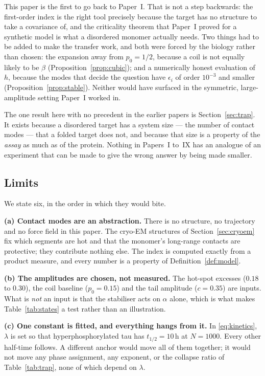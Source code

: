 \documentclass[11pt,reqno]{amsart}
\theoremstyle{plain}
\theoremstyle{definition}
\theoremstyle{remark}
\numberwithin{equation}{section}
\begin{document}
This paper is the first to go back to Paper~I. That is not a step backwards: the first-order index is the right tool precisely because the target has no structure to take a covariance of, and the criticality theorem that Paper~I proved for a synthetic model is what a disordered monomer actually needs. Two things had to be added to make the transfer work, and both were forced by the biology rather than chosen: the expansion away from $p_0=1/2$, because a coil is not equally likely to be $\beta$ (Proposition~\ref{prop:cubic}); and a numerically honest evaluation of $h$, because the modes that decide the question have $\epsilon_i$ of order $10^{-3}$ and smaller (Proposition~\ref{prop:stable}). Neither would have surfaced in the symmetric, large-amplitude setting Paper~I worked in.

The one result here with no precedent in the earlier papers is Section~\ref{sec:trap}. It exists because a disordered target has a system size --- the number of contact modes --- that a folded target does not, and because that size is a property of the \emph{assay} as much as of the protein. Nothing in Papers~I to~IX has an analogue of an experiment that can be made to give the wrong answer by being made smaller.

\subsection{Limits}
We state six, in the order in which they would bite.

\textbf{(a) Contact modes are an abstraction.} There is no structure, no trajectory and no force field in this paper. The cryo-EM structures of Section~\ref{sec:cryoem} fix which segments are hot and that the monomer's long-range contacts are protective; they contribute nothing else. The index is computed exactly from a product measure, and every number is a property of Definition~\ref{def:model}.

\textbf{(b) The amplitudes are chosen, not measured.} The hot-spot excesses ($0.18$ to $0.30$), the coil baseline ($p_0=0.15$) and the tail amplitude ($c=0.35$) are inputs. What is \emph{not} an input is that the stabiliser acts on $\alpha$ alone, which is what makes Table~\ref{tab:states} a test rather than an illustration.

\textbf{(c) One constant is fitted, and everything hangs from it.} In \eqref{eq:kinetics}, $\lambda$ is set so that hyperphosphorylated tau has $t_{1/2}=10$\,h at $N=1000$. Every other half-time follows. A different anchor would move all of them together; it would not move any phase assignment, any exponent, or the collapse ratio of Table~\ref{tab:trap}, none of which depend on $\lambda$.
\end{document}
